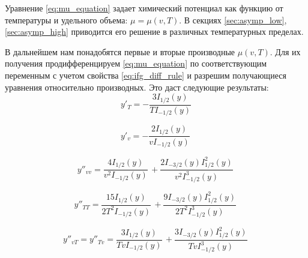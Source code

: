 Уравнение \eqref{eq:mu_equation} задает химический потенциал как функцию от температуры и удельного объема: $\mu = \mu(v, T)$.
В секциях \ref{sec:asymp_low}, \ref{sec:asymp_high} приводится его решение в различных температурных пределах.

В дальнейшем нам понадобятся первые и вторые производные $\mu(v, T)$.
Для их получения продифференцируем \eqref{eq:mu_equation} по соответствующим переменным с учетом свойства \eqref{eq:ifg_diff_rule} и разрешим получающиеся уравнения относительно производных. Это даст следующие результаты:
\begin{equation}
   \label{eq:mu_T}
   y'_{T} = -\frac{3 I_{1 / 2}(y)}{T I_{-1 / 2}(y)}
\end{equation}

\begin{equation}
   \label{eq:mu_v}
   y'_{v} = - \frac{2 I_{1 / 2} (y)}{v I_{-1 / 2} (y)}\,
\end{equation}

\begin{equation}
   \label{eq:mu_vv}
   y''_{vv} = \frac{4 I_{1 / 2} (y)}{v^2 I_{-1 / 2} (y)}\, + \frac{2 I_{-3 /2} (y) I_{1 / 2} ^2 (y)}{v^2 I_{-1 /2}^3 (y)}\,
\end{equation}

\begin{equation}
   \label{eq:mu_TT}
   y''_{TT} = \frac{15 I_{1 /2} (y)}{2 T^2 I_{-1 /2} (y)}\, + \frac{9 I_{-3 /2}(y) I_{1 /2}^2 (y)}{2 T^2 I_{-1 /2}^3 (y)}\,
\end{equation}

\begin{equation}
   \label{eq:mu_vT}
   y''_{vT} = y''_{Tv} = \frac{3 I_{1 /2}(y)}{T v I_{-1 /2} (y)}\, + \frac{3 I_{-3 /2} (y) I_{1 /2}^2 (y)}{T v I_{-1 /2}^3 (y)}\,
\end{equation}

